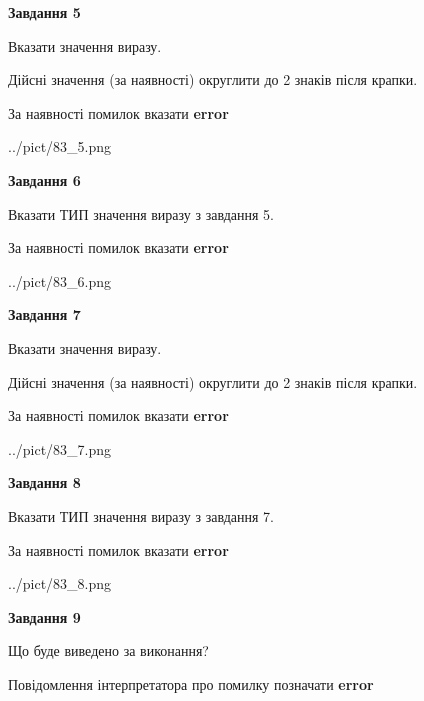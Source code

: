 \documentclass[11pt, ukrainian]{article}
\begin{document}
{\begin {large}
{\begin {center}\textbf{Завдання 5}\end {center}}\par
Вказати значення виразу. \par
Дійсні значення (за наявності) округлити до 2 знаків після крапки. \par
За наявності помилок вказати \textbf{error}

\begin{center}
	{../pict/83_5.png}
\end{center}
\newpage

{\begin {center}\textbf{Завдання 6}\end {center}}\par
Вказати ТИП значення виразу з завдання 5. \par
За наявності помилок вказати \textbf{error}

\begin{center}
	{../pict/83_6.png}
\end{center}
\newpage

{\begin {center}\textbf{Завдання 7}\end {center}}\par
Вказати значення виразу. \par
Дійсні значення (за наявності) округлити до 2 знаків після крапки. \par
За наявності помилок вказати \textbf{error}

\begin{center}
	{../pict/83_7.png}
\end{center}
\newpage

{\begin {center}\textbf{Завдання 8}\end {center}}\par
Вказати ТИП значення виразу з завдання 7. \par
За наявності помилок вказати \textbf{error}

\begin{center}
	{../pict/83_8.png}
\end{center}
\newpage

{\begin {center}\textbf{Завдання 9}\end {center}}\par
Що буде виведено за виконання? \par
Повідомлення інтерпретатора про помилку позначати \textbf{error}


\end{large}}
\end{document}

